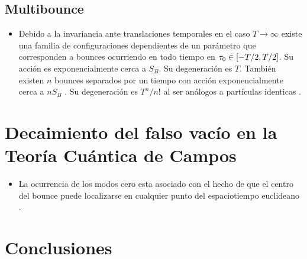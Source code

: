\documentclass[11pt, a4paper]{article}
\numberwithin{equation}{section}
\theoremstyle{definition}
\begin{document}
\begin{itemize}
%
%
%
%

\end{itemize}

\subsection{Multibounce}

\begin{itemize}
	
	\item Debido a la invariancia ante translaciones temporales en el caso $T \rightarrow \infty$ existe una familia de configuraciones dependientes de un parámetro que corresponden a bounces ocurriendo en todo tiempo en $\tau_0 \in \qty[-T/2, T/2]$. Su acción es exponencialmente cerca a $S_B$. Su degeneración es $T$. También existen $n$ bounces separados por un tiempo con acción  exponencialmente cerca a $nS_B$ . Su degeneración es $T^n/n!$ al ser análogos a partículas identicas \cite{paranjape2017theory}.
	
\end{itemize}

\section{Decaimiento del falso vacío en la Teoría Cuántica de Campos}

\begin{itemize}
\item La ocurrencia de los modos cero esta asociado con el hecho de que el centro del bounce puede localizarse en cualquier punto del espaciotiempo euclideano \cite{rubakov2009classical}. 
\end{itemize}

\section{Conclusiones}
\end{document}
